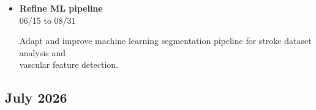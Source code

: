 \documentclass[landscape,a4paper]{article}
\begin{document}
\begin{itemize}[leftmargin=1cm, itemsep=0.8em]
    \item \textcolor{other}{\textbf{Refine ML pipeline}}\\[0.2em]
          \textcolor{black!70}{\small 06/15 to 08/31}
\\[0.3em]
          \begin{minipage}[t]{0.85\textwidth}
          \textcolor{black!80}{Adapt and improve machine learning segmentation pipeline for stroke dataset analysis and\\[0.1em]
          vascular feature detection.}
          \end{minipage}

\end{itemize}

\subsection*{July 2026}
\vspace{0.5cm}
\end{document}

